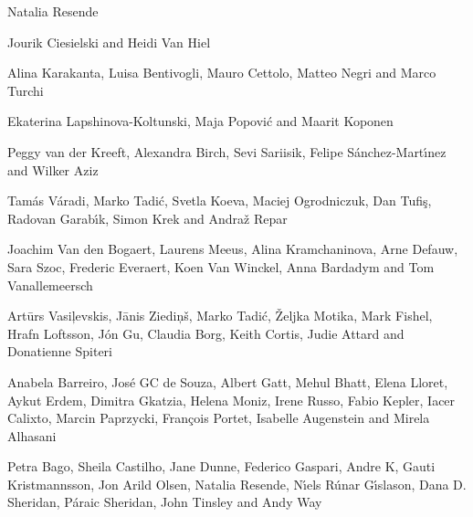 %
    {Natalia Resende}

%
    {Jourik Ciesielski and Heidi Van Hiel}

%
    {Alina Karakanta, Luisa Bentivogli, Mauro Cettolo, Matteo Negri and Marco Turchi}

%
    {Ekaterina Lapshinova-Koltunski, Maja Popovi\'{c} and Maarit Koponen}

%
    {Peggy van der Kreeft, Alexandra Birch, Sevi Sariisik, Felipe S\'{a}nchez-Mart\'{\i}nez and Wilker Aziz}

%
    {Tam\'{a}s V\'{a}radi, Marko Tadi\'{c}, Svetla Koeva, Maciej Ogrodniczuk, Dan Tufi\c{s}, Radovan Garab\'{\i}k, Simon Krek and Andra\v{z} Repar}

%
    {Joachim Van den Bogaert, Laurens Meeus, Alina Kramchaninova, Arne Defauw, Sara Szoc, Frederic Everaert, Koen Van Winckel, Anna Bardadym and Tom Vanallemeersch}

%
    {Art\={u}rs Vasi\c{l}evskis, J\={a}nis Ziedi\c{n}\v{s}, Marko Tadi\'{c}, \v{Z}eljka Motika, Mark Fishel, Hrafn Loftsson, J\'{o}n Gu\dhnason, Claudia Borg, Keith Cortis, Judie Attard and Donatienne Spiteri}

%
    {Anabela Barreiro, Jos\'{e} GC de Souza, Albert Gatt, Mehul Bhatt, Elena Lloret, Aykut Erdem, Dimitra Gkatzia, Helena Moniz, Irene Russo, Fabio Kepler, Iacer Calixto, Marcin Paprzycki, Fran\c{c}ois Portet, Isabelle Augenstein and Mirela Alhasani}

%
    {Petra Bago, Sheila Castilho, Jane Dunne, Federico Gaspari, Andre K\aasen, Gauti Kristmannsson, Jon Arild Olsen, Natalia Resende, N\'{\i}els R\'{u}nar G\'{\i}slason, Dana D. Sheridan, P\'{a}raic Sheridan, John Tinsley and Andy Way}

